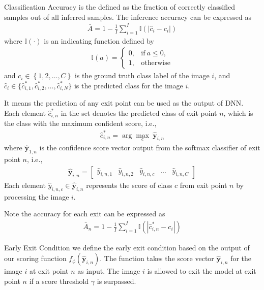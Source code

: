 \begin{enumdescript}
	\item[Classification Accuracy] is the defined as the fraction of correctly classified samples out of all inferred samples. The inference accuracy can be expressed as
	\begin{align}
	\bar{A}=1-\frac{1}{I} \sum_{i=1}^{I} \mathbb{I}\left(\left|\hat{c}_{i}-c_{i}\right|\right) \label{eq:accuracy}
	\end{align}
	where $ \mathbb{I(\cdot)}  $ is an indicating function defined by
	\begin{align}
	\mathbb{I}(a)= \begin{cases}
	0, & \mathrm{if\:} a \leq 0, \\
	1, & \mathrm{otherwise}
	\end{cases} \label{eq:indicator}
	\end{align}
	and $ c_i \in \left\{1, 2, \dots, C \right\} $ is the ground truth class label of the image $ i $, and $  \hat{c}_i \in \{\hat{c}^*_{i,1} , \hat{c}^*_{i,2}, \dots, \hat{c}^*_{i,N} \} $ is the predicted class for the image $ i $. 
	
	It means the prediction of any exit point can be used as the output of DNN. Each element $ \hat{c}^*_{i,n} $ in the set denotes the predicted class of exit point $ n $, which is the class with the maximum confident score, i.e.,
	\begin{align}
	\hat{c}^*_{i,n} = \arg \underset{c}{\max}\: \bm{\hat{y}}_{i,n}
	\end{align}
	where $ \bm{\hat{y}}_{1,n} $ is the confidence score vector output from the softmax classifier of exit point $ n $, i.e.,
	\begin{align}
	\bm{\hat{y}}_{i,n} = \left[\begin{array}{ccccc}\hat{y}_{i,n,1} & \hat{y}_{i,n,2} & \hat{y}_{i,n,c} & \dots & \hat{y}_{i,n,C}\end{array}\right]
	\end{align}
	Each element $ \hat{y}_{i,n,c} \in \bm{\hat{y}}_{i,n} $ represents the score of class $ c $ from exit point $ n $ by processing the image $ i $.
	
	Note the accuracy for each exit can be expressed as
	\begin{align}
	\bar{A}_n=1-\frac{1}{I} \sum_{i=1}^{I} \mathbb{I}\left(\left|\hat{c}^*_{i,n}-c_{i}\right|\right)
	\end{align}
	
	\item[Early Exit Condition] we define the early exit condition based on the output of our scoring function $ f_\phi(\bm{\hat{y}}_{i,n}) $. The function takes the score vector $ \bm{\hat{y}}_{i,n} $ for the image $ i $ at exit point $ n $ as input. The image $ i $ is allowed to exit the model at exit point $ n $ if a score threshold $ \gamma $ is surpassed. 
	

\end{enumdescript}
